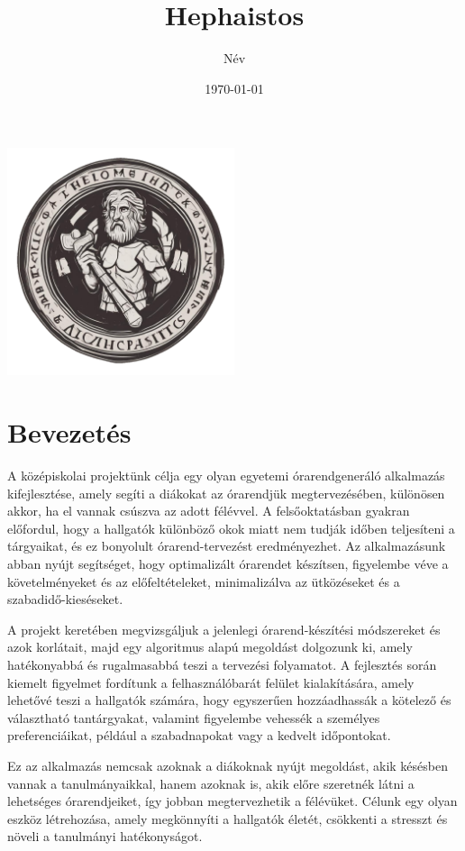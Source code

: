 \documentclass{article}
\title{Hephaistos}
\author{Név}
\date{\today}
\begin{document}
\maketitle
\begin{center}
    \includegraphics[width=0.5\textwidth]{logo.png}
\end{center}

\newpage

\tableofcontents

\newpage

\section*{Bevezetés}
A középiskolai projektünk célja egy olyan egyetemi órarendgeneráló alkalmazás kifejlesztése, amely segíti a diákokat az órarendjük megtervezésében, különösen akkor, ha el vannak csúszva az adott félévvel. A felsőoktatásban gyakran előfordul, hogy a hallgatók különböző okok miatt nem tudják időben teljesíteni a tárgyaikat, és ez bonyolult órarend-tervezést eredményezhet. Az alkalmazásunk abban nyújt segítséget, hogy optimalizált órarendet készítsen, figyelembe véve a követelményeket és az előfeltételeket, minimalizálva az ütközéseket és a szabadidő-kieséseket.

A projekt keretében megvizsgáljuk a jelenlegi órarend-készítési módszereket és azok korlátait, majd egy algoritmus alapú megoldást dolgozunk ki, amely hatékonyabbá és rugalmasabbá teszi a tervezési folyamatot. A fejlesztés során kiemelt figyelmet fordítunk a felhasználóbarát felület kialakítására, amely lehetővé teszi a hallgatók számára, hogy egyszerűen hozzáadhassák a kötelező és választható tantárgyakat, valamint figyelembe vehessék a személyes preferenciáikat, például a szabadnapokat vagy a kedvelt időpontokat.

Ez az alkalmazás nemcsak azoknak a diákoknak nyújt megoldást, akik késésben vannak a tanulmányaikkal, hanem azoknak is, akik előre szeretnék látni a lehetséges órarendjeiket, így jobban megtervezhetik a félévüket. Célunk egy olyan eszköz létrehozása, amely megkönnyíti a hallgatók életét, csökkenti a stresszt és növeli a tanulmányi hatékonyságot.
\end{document}
